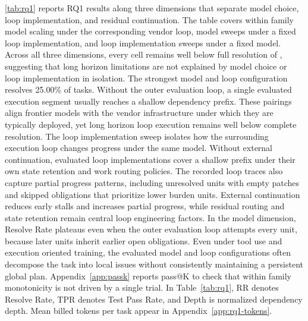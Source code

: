 \autoref{tab:rq1} reports RQ1 results along three dimensions that separate model choice, loop implementation, and residual continuation. The table covers within family model scaling under the corresponding vendor loop, model sweeps under a fixed loop implementation, and loop implementation sweeps under a fixed model.
Across all three dimensions, every cell remains well below full resolution of \lhb{}, suggesting that long horizon limitations are not explained by model choice or loop implementation in isolation.
The strongest model and loop configuration resolves 25.00\% of tasks. Without the outer evaluation loop, a single evaluated execution segment usually reaches a shallow dependency prefix.
These pairings align frontier models with the vendor infrastructure under which they are typically deployed, yet long horizon loop execution remains well below complete resolution.
The loop implementation sweep isolates how the surrounding execution loop changes progress under the same model.
Without external continuation, evaluated loop implementations cover a shallow prefix under their own state retention and work routing policies.
The recorded loop traces also capture partial progress patterns, including unresolved units with empty patches and skipped obligations that prioritize lower burden units.
External continuation reduces early stalls and increases partial progress, while residual routing and state retention remain central loop engineering factors.
In the model dimension, Resolve Rate plateaus even when the outer evaluation loop attempts every unit, because later units inherit earlier open obligations.
Even under tool use and execution oriented training, the evaluated model and loop configurations often decompose the task into local issues without consistently maintaining a persistent global plan. Appendix~\ref{app:passk} reports pass@K to check that within family monotonicity is not driven by a single trial. In Table~\ref{tab:rq1}, RR denotes Resolve Rate, TPR denotes Test Pass Rate, and Depth is normalized dependency depth. Mean billed tokens per task appear in Appendix~\ref{app:rq1-tokens}.

